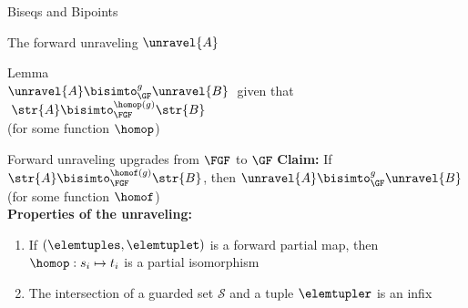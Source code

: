 \documentclass[aspectratio=169]{beamer}
\begin{document}
{
}

\begin{frame}{Biseqs and Bipoints}
  
\end{frame}

\begin{frame}{The forward unraveling $\unravel{A}$}
  
\end{frame}

\begin{frame}
  \begin{center}
    \Huge
    {Lemma} \\[0.5ex]
    \huge
    $\unravel{A} \bisimto_{\GF}^{g} \unravel{B}\;$ given that $\;\str{A} \bisimto_{\FGF}^{\homop(g)} \str{B}$ \\[0.2ex]
    \normalsize
    (for some function $\homop$)
  \end{center}
\end{frame}

\begin{frame}{Forward unraveling upgrades from $\FGF$ to $\GF$}
  \textbf{Claim:} If $\str{A} \bisimto_{\FGF}^{\homof(g)} \str{B}$, then $\unravel{A} \bisimto_{\GF}^{g} \unravel{B}$ (for some function $\homof$) \\[1.5em]

  \textbf{Properties of the unraveling:}\\[0.5em]
  \begin{enumerate}
    \item If $(\elemtuples, \elemtuplet)$ is a forward partial map, then $\homop: s_{i} \mapsto t_{i}$ is a partial isomorphism
          \vspace{0.5em}

          
    \item<2> The intersection of a guarded set $\mathcal{S}$ and a tuple $\elemtupler$ is an infix
          \vspace{0.5em}

          
  \end{enumerate}
\end{frame}
\end{document}
